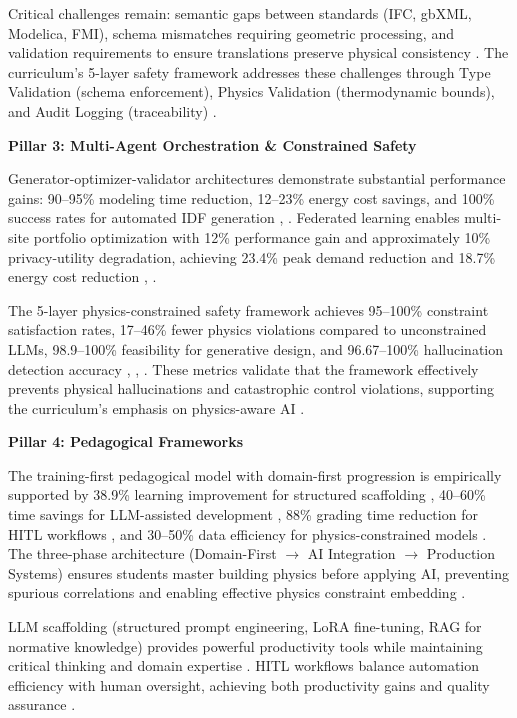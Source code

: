\documentclass[12pt,a4paper]{article}
\begin{document}
Critical challenges remain: semantic gaps between standards (IFC, gbXML, Modelica, FMI), schema mismatches requiring geometric processing, and validation requirements to ensure translations preserve physical consistency \cite{ref353}. The curriculum's 5-layer safety framework addresses these challenges through Type Validation (schema enforcement), Physics Validation (thermodynamic bounds), and Audit Logging (traceability) \cite{ref354}.

\textbf{Pillar 3: Multi-Agent Orchestration \& Constrained Safety}

Generator-optimizer-validator architectures demonstrate substantial performance gains: 90--95\% modeling time reduction, 12--23\% energy cost savings, and 100\% success rates for automated IDF generation \cite{ref355}, \cite{ref356}. Federated learning enables multi-site portfolio optimization with 12\% performance gain and approximately 10\% privacy-utility degradation, achieving 23.4\% peak demand reduction and 18.7\% energy cost reduction \cite{ref357}, \cite{ref358}.

The 5-layer physics-constrained safety framework achieves 95--100\% constraint satisfaction rates, 17--46\% fewer physics violations compared to unconstrained LLMs, 98.9--100\% feasibility for generative design, and 96.67--100\% hallucination detection accuracy \cite{ref359}, \cite{ref360}, \cite{ref361}. These metrics validate that the framework effectively prevents physical hallucinations and catastrophic control violations, supporting the curriculum's emphasis on physics-aware AI \cite{ref362}.

\textbf{Pillar 4: Pedagogical Frameworks}

The training-first pedagogical model with domain-first progression is empirically supported by 38.9\% learning improvement for structured scaffolding \cite{ref363}, 40--60\% time savings for LLM-assisted development \cite{ref364}, 88\% grading time reduction for HITL workflows \cite{ref365}, and 30--50\% data efficiency for physics-constrained models \cite{ref366}. The three-phase architecture (Domain-First $\rightarrow$ AI Integration $\rightarrow$ Production Systems) ensures students master building physics before applying AI, preventing spurious correlations and enabling effective physics constraint embedding \cite{ref367}.

LLM scaffolding (structured prompt engineering, LoRA fine-tuning, RAG for normative knowledge) provides powerful productivity tools while maintaining critical thinking and domain expertise \cite{ref368}. HITL workflows balance automation efficiency with human oversight, achieving both productivity gains and quality assurance \cite{ref369}.
\end{document}
